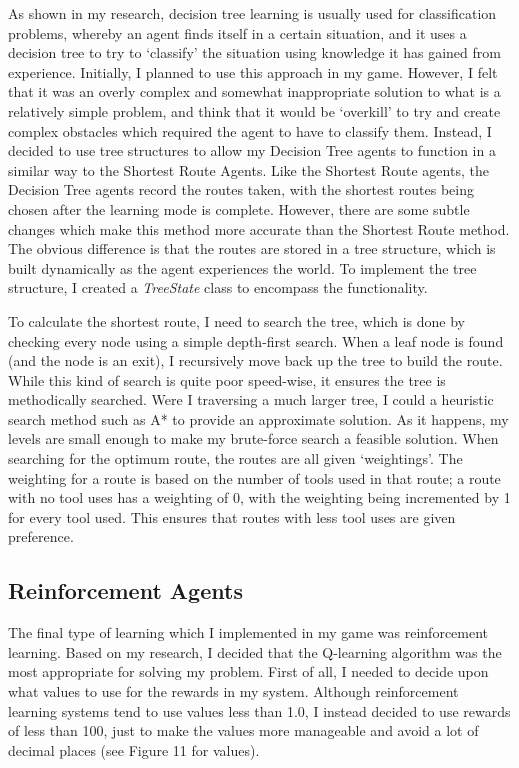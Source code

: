\documentclass[a4paper,oneside]{report}
\begin{document}
As shown in my research, decision tree learning is usually used for classification problems, whereby an agent finds itself in a certain situation, and it uses a decision tree to try to `classify' the situation using knowledge it has gained from experience. Initially, I planned to use this approach in my game. However, I felt that it was an overly complex and somewhat inappropriate solution to what is a relatively simple problem, and think that it would be `overkill' to try and create complex obstacles which required the agent to have to classify them. Instead, I decided to use tree structures to allow my Decision Tree agents to function in a similar way to the Shortest Route Agents. Like the Shortest Route agents, the Decision Tree agents record the routes taken, with the shortest routes being chosen after the learning mode is complete. However, there are some subtle changes which make this method more accurate than the Shortest Route method. The obvious difference is that the routes are stored in a tree structure, which is built dynamically as the agent experiences the world. To implement the tree structure, I created a \emph{TreeState} class to encompass the functionality.

To calculate the shortest route, I need to search the tree, which is done by checking every node using a simple depth-first search. When a leaf node is found (and the node is an exit), I recursively move back up the tree to build the route. While this kind of search is quite poor speed-wise, it ensures the tree is methodically searched. Were I traversing a much larger tree, I could a heuristic search method such as A* to provide an approximate solution. As it happens, my levels are small enough to make my brute-force search a feasible solution. When searching for the optimum route, the routes are all given `weightings'. The weighting for a route is based on the number of tools used in that route; a route with no tool uses has a weighting of 0, with the weighting being incremented by 1 for every tool used. This ensures that routes with less tool uses are given preference.

\subsection{Reinforcement Agents}

The final type of learning which I implemented in my game was reinforcement learning. Based on my research, I decided that the Q-learning algorithm was the most appropriate for solving my problem. First of all, I needed to decide upon what values to use for the rewards in my system. Although reinforcement learning systems tend to use values less than 1.0, I instead decided to use rewards of less than 100, just to make the values more manageable and avoid a lot of decimal places (see Figure 11 for values).
\end{document}
